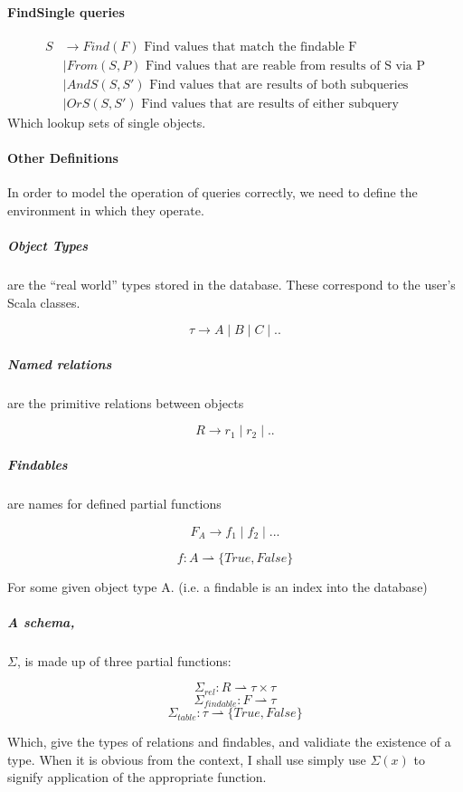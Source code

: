 \documentclass[12pt,a4paper,twoside,openright]{report}
\begin{document}
\paragraph{FindSingle queries}
\begin{equation}
\label{SDefinition}
\begin{split}
S & \rightarrow Find(F) \mbox{ Find values that match the findable F}\\
&\mid From(S, P) \mbox{ Find values that are reable from results of S via P}\\
&\mid AndS(S, S') \mbox{ Find values that are results of both subqueries}\\
& \mid OrS(S, S') \mbox{ Find values that are results of either subquery}
\end{split}
\end{equation} 
Which lookup sets of single objects.\\

\paragraph{Other Definitions}
In order to model the operation of queries correctly, we need to define the environment in which they operate.

\subparagraph{Object Types} are the ``real world'' types stored in the database. These correspond to the user's Scala classes.

\[ \tau \rightarrow A \mid B \mid C \mid .. \]

\subparagraph{Named relations} are the primitive relations between objects

\[R \rightarrow r_1 \mid r_2 \mid .. \]

\subparagraph{Findables} are names for defined partial functions

\[F_A \rightarrow f_1 \mid f_2 \mid ... \]

\[f \colon A \rightharpoonup \{True, False\} \]

For some given object type A. (i.e. a findable is an index into the database)

\subparagraph{A schema,}$\Sigma$, is made up of three partial functions:

\[\Sigma_{rel}\colon R \rightharpoonup \tau\times\tau \]
\[\Sigma_{findable}\colon F \rightharpoonup \tau \]
\[\Sigma_{table}\colon \tau \rightharpoonup \{True, False\} \]

Which, give the types of relations and findables, and validiate the existence of a type. When it is obvious from the context, I shall use simply use $\Sigma(x)$ to signify application of the appropriate function.
 
\end{document}
